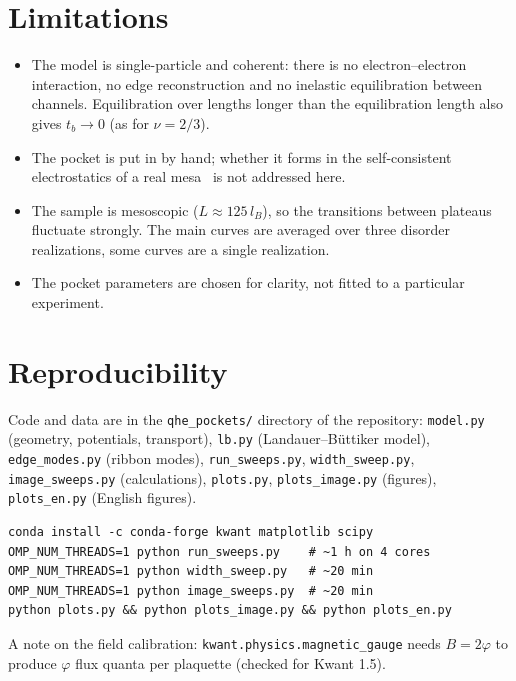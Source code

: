 \documentclass[11pt,a4paper]{article}
\newcommand{\tb}{t_b}
\newcommand{\lB}{l_B}
\begin{document}
\section{Limitations}
\begin{itemize}
\item The model is single-particle and coherent: there is no
  electron--electron interaction, no edge reconstruction and no inelastic
  equilibration between channels. Equilibration over lengths longer than
  the equilibration length also gives $\tb\to0$ (as for $\nu=2/3$).
\item The pocket is put in by hand; whether it forms in the self-consistent
  electrostatics of a real mesa~\cite{ciuti,chklovskii} is not addressed
  here.
\item The sample is mesoscopic ($L\approx125\,\lB$), so the transitions
  between plateaus fluctuate strongly. The main curves are averaged over
  three disorder realizations, some curves are a single realization.
\item The pocket parameters are chosen for clarity, not fitted to a
  particular experiment.
\end{itemize}

\appendix
\section{Reproducibility}
{\raggedright Code and data are in the \texttt{qhe\_pockets/} directory of the
repository: \texttt{model.py} (geometry, potentials, transport),
\texttt{lb.py} (Landauer--Büttiker model), \texttt{edge\_modes.py} (ribbon
modes), \texttt{run\_sweeps.py}, \texttt{width\_sweep.py},
\texttt{image\_sweeps.py} (calculations), \texttt{plots.py},
\texttt{plots\_image.py} (figures), \texttt{plots\_en.py} (English figures).\par}
\begin{verbatim}
conda install -c conda-forge kwant matplotlib scipy
OMP_NUM_THREADS=1 python run_sweeps.py    # ~1 h on 4 cores
OMP_NUM_THREADS=1 python width_sweep.py   # ~20 min
OMP_NUM_THREADS=1 python image_sweeps.py  # ~20 min
python plots.py && python plots_image.py && python plots_en.py
\end{verbatim}
A note on the field calibration: \texttt{kwant.physics.magnetic\_gauge}
needs $B=2\varphi$ to produce $\varphi$ flux quanta per plaquette (checked
for Kwant 1.5).
\end{document}
